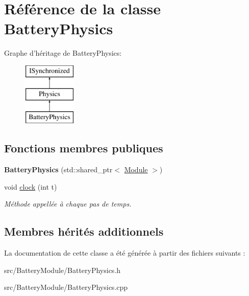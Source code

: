 \hypertarget{classBatteryPhysics}{\section{Référence de la classe Battery\-Physics}
\label{classBatteryPhysics}
}
Graphe d'héritage de Battery\-Physics\-:\begin{figure}[H]
\begin{center}
\leavevmode
\includegraphics[height=3.000000cm]{classBatteryPhysics}
\end{center}
\end{figure}
\subsection*{Fonctions membres publiques}
\begin{DoxyCompactItemize}
\item 
\hypertarget{classBatteryPhysics_ac6fa6a615d95447a246d8f0dc01e7b02}{{\bfseries Battery\-Physics} (std\-::shared\-\_\-ptr$<$ \hyperlink{classModule}{Module} $>$)}\label{classBatteryPhysics_ac6fa6a615d95447a246d8f0dc01e7b02}

\item 
\hypertarget{classBatteryPhysics_a3651cc1fbb0d314a03d25af655804acc}{void \hyperlink{classBatteryPhysics_a3651cc1fbb0d314a03d25af655804acc}{clock} (int t)}\label{classBatteryPhysics_a3651cc1fbb0d314a03d25af655804acc}

\begin{DoxyCompactList}\small\item\em Méthode appellée à chaque pas de temps. \end{DoxyCompactList}\end{DoxyCompactItemize}
\subsection*{Membres hérités additionnels}


La documentation de cette classe a été générée à partir des fichiers suivants \-:\begin{DoxyCompactItemize}
\item 
src/\-Battery\-Module/Battery\-Physics.\-h\item 
src/\-Battery\-Module/Battery\-Physics.\-cpp\end{DoxyCompactItemize}
